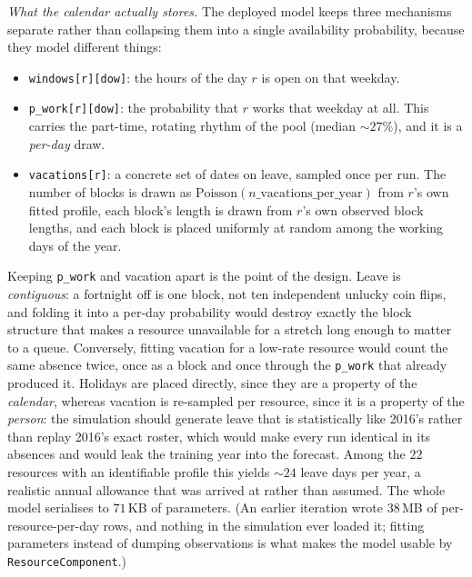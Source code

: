 \emph{What the calendar actually stores.} The deployed model keeps three
mechanisms separate rather than collapsing them into a single availability
probability, because they model different things:
\begin{itemize}
  \item \texttt{windows[r][dow]}: the hours of the day $r$ is open on that
        weekday.
  \item \texttt{p\_work[r][dow]}: the probability that $r$ works that weekday
        at all. This carries the part-time, rotating rhythm of the pool (median
        $\sim\!27\%$), and it is a \emph{per-day} draw.
  \item \texttt{vacations[r]}: a concrete set of dates on leave, sampled once
        per run. The number of blocks is drawn as
        $\text{Poisson}(n\_\text{vacations\_per\_year})$ from $r$'s own fitted
        profile, each block's length is drawn from $r$'s own observed block
        lengths, and each block is placed uniformly at random among the working
        days of the year.
\end{itemize}
Keeping \texttt{p\_work} and vacation apart is the point of the design. Leave
is \emph{contiguous}: a fortnight off is one block, not ten independent unlucky
coin flips, and folding it into a per-day probability would destroy exactly the
block structure that makes a resource unavailable for a stretch long enough to
matter to a queue. Conversely, fitting vacation for a low-rate resource would
count the same absence twice, once as a block and once through the
\texttt{p\_work} that already produced it. Holidays are placed directly, since
they are a property of the \emph{calendar}, whereas vacation is re-sampled per
resource, since it is a property of the \emph{person}: the simulation should
generate leave that is statistically like 2016's rather than replay 2016's
exact roster, which would make every run identical in its absences and would
leak the training year into the forecast. Among the $22$ resources with an
identifiable profile this yields $\sim\!24$ leave days per year, a realistic
annual allowance that was arrived at rather than assumed. The whole model
serialises to $71$\,KB of parameters. (An earlier iteration wrote $38$\,MB of
per-resource-per-day rows, and nothing in the simulation ever loaded it;
fitting parameters instead of dumping observations is what makes the model
usable by \texttt{ResourceComponent}.)

